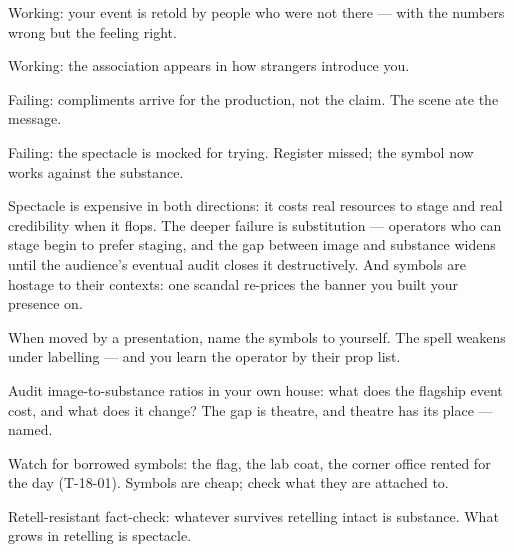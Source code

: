 \begin{feedback}
  \item Working: your event is retold by people who were not there --- with the numbers wrong but the feeling right.
  \item Working: the association appears in how strangers introduce you.
  \item Failing: compliments arrive for the production, not the claim. The scene ate the message.
  \item Failing: the spectacle is mocked for trying. Register missed; the symbol now works against the substance.
\end{feedback}
\begin{failure}
Spectacle is expensive in both directions: it costs real resources to stage and real credibility when it flops. The deeper failure is substitution --- operators who can stage begin to prefer staging, and the gap between image and substance widens until the audience's eventual audit closes it destructively. And symbols are hostage to their contexts: one scandal re-prices the banner you built your presence on.
\end{failure}
\begin{countermeasures}
  \item When moved by a presentation, name the symbols to yourself. The spell weakens under labelling --- and you learn the operator by their prop list.
  \item Audit image-to-substance ratios in your own house: what does the flagship event cost, and what does it change? The gap is theatre, and theatre has its place --- named.
  \item Watch for borrowed symbols: the flag, the lab coat, the corner office rented for the day (T-18-01). Symbols are cheap; check what they are attached to.
  \item Retell-resistant fact-check: whatever survives retelling intact is substance. What grows in retelling is spectacle.
\end{countermeasures}

\seesources
{}
